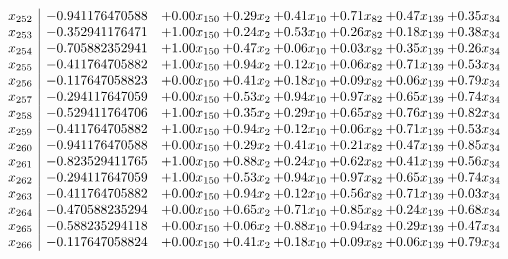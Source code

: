 \documentclass[8pt]{article}
\begin{document}
\[\begin{array}{c| c c@{\hskip 2pt} c@{\hskip 2pt} c@{\hskip 2pt} c@{\hskip 2pt} c@{\hskip 2pt} c@{\hskip 2pt} }
 x_{252}   &  -0.941176470588 & +  0.00 x_{150} & +  0.29 x_{2} & +  0.41 x_{10} & +  0.71 x_{82} & +  0.47 x_{139} & +  0.35 x_{34}\\
 x_{253}   &  -0.352941176471 & +  1.00 x_{150} & +  0.24 x_{2} & +  0.53 x_{10} & +  0.26 x_{82} & +  0.18 x_{139} & +  0.38 x_{34}\\
 x_{254}   &  -0.705882352941 & +  1.00 x_{150} & +  0.47 x_{2} & +  0.06 x_{10} & +  0.03 x_{82} & +  0.35 x_{139} & +  0.26 x_{34}\\
 x_{255}   &  -0.411764705882 & +  1.00 x_{150} & +  0.94 x_{2} & +  0.12 x_{10} & +  0.06 x_{82} & +  0.71 x_{139} & +  0.53 x_{34}\\
 x_{256}   &  -0.117647058823 & +  0.00 x_{150} & +  0.41 x_{2} & +  0.18 x_{10} & +  0.09 x_{82} & +  0.06 x_{139} & +  0.79 x_{34}\\
 x_{257}   &  -0.294117647059 & +  0.00 x_{150} & +  0.53 x_{2} & +  0.94 x_{10} & +  0.97 x_{82} & +  0.65 x_{139} & +  0.74 x_{34}\\
 x_{258}   &  -0.529411764706 & +  1.00 x_{150} & +  0.35 x_{2} & +  0.29 x_{10} & +  0.65 x_{82} & +  0.76 x_{139} & +  0.82 x_{34}\\
 x_{259}   &  -0.411764705882 & +  1.00 x_{150} & +  0.94 x_{2} & +  0.12 x_{10} & +  0.06 x_{82} & +  0.71 x_{139} & +  0.53 x_{34}\\
 x_{260}   &  -0.941176470588 & +  0.00 x_{150} & +  0.29 x_{2} & +  0.41 x_{10} & +  0.21 x_{82} & +  0.47 x_{139} & +  0.85 x_{34}\\
 x_{261}   &  -0.823529411765 & +  1.00 x_{150} & +  0.88 x_{2} & +  0.24 x_{10} & +  0.62 x_{82} & +  0.41 x_{139} & +  0.56 x_{34}\\
 x_{262}   &  -0.294117647059 & +  1.00 x_{150} & +  0.53 x_{2} & +  0.94 x_{10} & +  0.97 x_{82} & +  0.65 x_{139} & +  0.74 x_{34}\\
 x_{263}   &  -0.411764705882 & +  0.00 x_{150} & +  0.94 x_{2} & +  0.12 x_{10} & +  0.56 x_{82} & +  0.71 x_{139} & +  0.03 x_{34}\\
 x_{264}   &  -0.470588235294 & +  0.00 x_{150} & +  0.65 x_{2} & +  0.71 x_{10} & +  0.85 x_{82} & +  0.24 x_{139} & +  0.68 x_{34}\\
 x_{265}   &  -0.588235294118 & +  0.00 x_{150} & +  0.06 x_{2} & +  0.88 x_{10} & +  0.94 x_{82} & +  0.29 x_{139} & +  0.47 x_{34}\\
 x_{266}   &  -0.117647058824 & +  0.00 x_{150} & +  0.41 x_{2} & +  0.18 x_{10} & +  0.09 x_{82} & +  0.06 x_{139} & +  0.79 x_{34}\\

\end{array}\]
\end{document}
